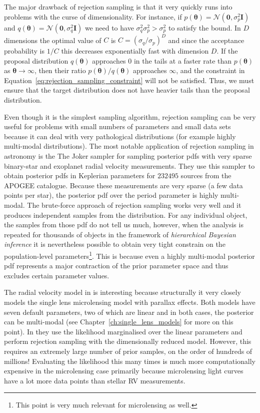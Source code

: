 \documentclass[12pt,dvipsnames]{report}
\newcommand{\ssf}[1]{\textsf{#1}}
\renewcommand{\vec}[1]{\boldsymbol{\mathbf{#1}}}
\begin{document}
The major drawback of rejection sampling is that it very quickly runs into problems 
with the curse of dimensionality.
For instance, if
$p(\vec{\theta})=\mathcal{N}(\vec{0}, \sigma_p^2\vec{I})$ and
$q(\vec{\theta})=\mathcal{N}(\vec{0}, \sigma_q^2\vec{I})$ we need to have
$\sigma_q^2\sigma_p^2>\sigma_p^2$ to satisfy the bound. In $D$ dimensions the
optimal value of $C$ is $C=(\sigma_q/\sigma_p)^D$ and since the acceptance
probability is $1/C$ this decreases exponentially fast with dimension $D$. If
the proposal distribution $q(\vec{\theta})$ approaches $0$ in the tails at
a faster rate than $p(\vec{\theta})$ as $\vec{\theta}\rightarrow \infty$, then
their ratio $p(\vec{\theta})/q(\vec{\theta})$ approaches $\infty$, and the
constraint in Equation~\ref{eq:rejection_sampling_constraint} will not be
satisfied. Thus, we must ensure that the target distribution does not have
heavier tails than the proposal distribution.

Even though it is the simplest sampling algorithm, rejection sampling can be
very useful for problems with small numbers of parameters and small data sets
because it can deal with very pathological distributions (for example highly
multi-modal distributions). The most notable application of rejection sampling
in astronomy is the \ssf{The Joker} sampler \citep{2017ApJ...837...20P} for
sampling posterior pdfs with very sparse binary-star and exoplanet radial
velocity measurements.  They use this sampler to obtain
posterior pdfs in Keplerian parameters for $232 495$ sources from the APOGEE
catalogue. Because these measurements are very sparse (a few data points per
star), the posterior pdf over the period parameter is highly multi-modal. The
brute-force approach of rejection sampling works very well and it produces
independent samples from the distribution. For any individual object, the samples from those 
pdf do not tell us much, however, when the analysis is repeated for thousands of
objects in the framework of \emph{hierarchical Bayesian inference} it is
nevertheless possible to obtain very tight constrain on the population-level
parameters\footnote{This point is very much relevant for microlensing as well.}. 
This is because even a highly multi-modal posterior pdf represents
a major contraction of the prior parameter space and thus excludes certain
parameter values.

The radial velocity model in \citet{2017ApJ...837...20P} is interesting because
structurally it very closely models the single lens microlensing model with
parallax effects. Both models have seven default parameters, two of
which are linear and in both cases, the posterior can be multi-modal (see
Chapter~\ref{ch:single_lens_models} for more on this point). In
\citet{2017ApJ...837...20P} they use the likelihood marginalised over the
linear parameters and perform rejection sampling with the dimensionally reduced
model. However, this requires an extremely large number of prior samples, on
the order of hundreds of millions! Evaluating the likelihood this many times is
much more computationally expensive in the microlensing case primarily because
microlensing light curves have a lot more data points than stellar RV
measurements. 
\end{document}
